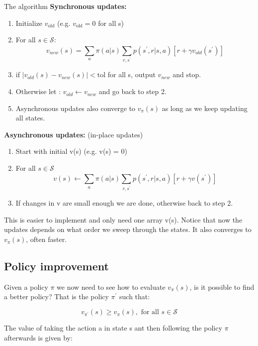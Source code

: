\begin{wbox}{The algorithm}
\textbf{Synchronous updates:}
 \begin{enumerate}
 	\item Initialize $v_{\text{old}}$ (e.g. $v_{\text{old}} = 0$ for all s)
 	\item For all $s \in \mathcal{S}$:
	 	\begin{equation}
	 		v_{new}(s) = \sum_{a}^{} \pi (a|s) \sum_{r, s^{\prime}}^{} p(s^{\prime},r|s,a)[r + \gamma v_{old} (s^{\prime})]
	 	\end{equation}
	 \item if $|v_{old}(s) - v_{new}(s)| < \text{tol}$ for all s, output $v_{new} $ and stop.  
	 \item Otherwise let : $v_{old} \leftarrow v_{new}$ and go back to step 2. 
	 \item  Asynchronous updates also converge to $v_\pi(s)$ as long as we keep updating all states.
 \end{enumerate}
\textbf{Asynchronous updates: } (in-place updates)
\begin{enumerate}
	\item Start with initial v(s) (e.g. v(s) = 0)
	\item For all $s \in \mathcal{S}$
		\begin{equation}
			v(s) \leftarrow \sum_{a}^{}\pi(a|s) \sum_{r, s^{\prime}}^{} p(s^{\prime},r|s,a)[r+\gamma v(s^{\prime})]
		\end{equation}
	\item If changes in v are small enough we are done, otherwise back to step 2. 
\end{enumerate}
This is easier to implement and only need one array v(s). Notice that now the updates depends on what order we sweep through the states. It also converges to $v_\pi (s)$, often faster. 
\end{wbox}

\subsection*{Policy improvement}
Given a policy $\pi$ we now need to see how to evaluate $v_\pi(s)$, is it possible to find a better policy? That is the policy $\pi^{\prime}$ such that:

	\begin{equation}
		v_{\pi^{\prime}}(s) \ge v_\pi(s), \text{ for all } s \in \mathcal{S}
	\end{equation}

The value of taking the action a in state s ant then following the policy $\pi$ afterwards is given by:

